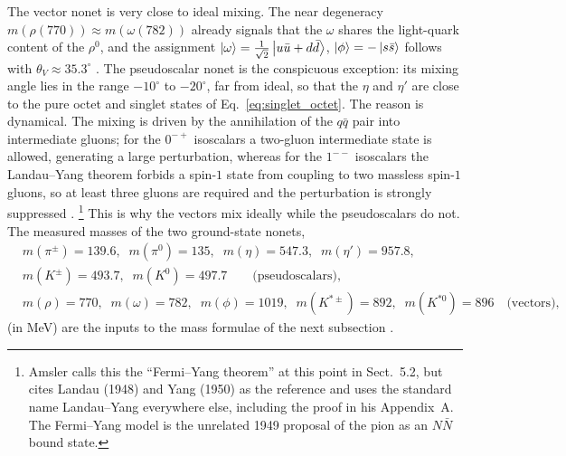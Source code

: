 The vector nonet is very close to ideal mixing. The near degeneracy
$m(\rho(770)) \approx m(\omega(782))$ already signals that the $\omega$ shares the
light-quark content of the $\rho^0$, and the assignment
$\ket{\omega} = \tfrac{1}{\sqrt 2}\ket{u\bar u + d\bar d}$,
$\ket{\phi} = -\ket{s\bar s}$ follows with $\theta_V \approx 35.3^\circ$
\cite[Ch.~5]{Amsler2018}. The pseudoscalar nonet is the conspicuous exception: its
mixing angle lies in the range $-10^\circ$ to $-20^\circ$, far from ideal, so that
the $\eta$ and $\eta'$ are close to the pure octet and singlet states of
Eq.~\eqref{eq:singlet_octet}. The reason is dynamical. The mixing is driven by the
annihilation of the $q\bar q$ pair into intermediate gluons; for the $0^{-+}$
isoscalars a two-gluon intermediate state is allowed, generating a large
perturbation, whereas for the $1^{--}$ isoscalars the Landau--Yang theorem forbids a
spin-$1$ state from coupling to two massless spin-$1$ gluons, so at least three gluons are
required and the perturbation is strongly suppressed \cite[Ch.~5]{Amsler2018}.%
\footnote{Amsler calls this the ``Fermi--Yang theorem'' at this point in Sect.~5.2,
but cites Landau (1948) and Yang (1950) as the reference and uses the standard name
Landau--Yang everywhere else, including the proof in his Appendix~A. The Fermi--Yang
model is the unrelated 1949 proposal of the pion as an $N\bar N$ bound state.} This
is why the vectors mix ideally while the pseudoscalars do not. The measured masses
of the two ground-state nonets,
\begin{equation}
\begin{aligned}
    &m(\pi^\pm) = 139.6,\;\; m(\pi^0) = 135,\;\;
     m(\eta) = 547.3,\;\; m(\eta') = 957.8,\\
    &m(K^\pm) = 493.7,\;\; m(K^0) = 497.7
    \qquad\text{(pseudoscalars)},\\[2pt]
    &m(\rho) = 770,\;\; m(\omega) = 782,\;\; m(\phi) = 1019,\;\;
     m(K^{*\pm}) = 892,\;\; m(K^{*0}) = 896
     \quad\text{(vectors)},
\end{aligned}
\label{eq:nonet_masses}
\end{equation}
(in MeV) are the inputs to the mass formulae of the next subsection
\cite[Ch.~5]{Amsler2018}.

